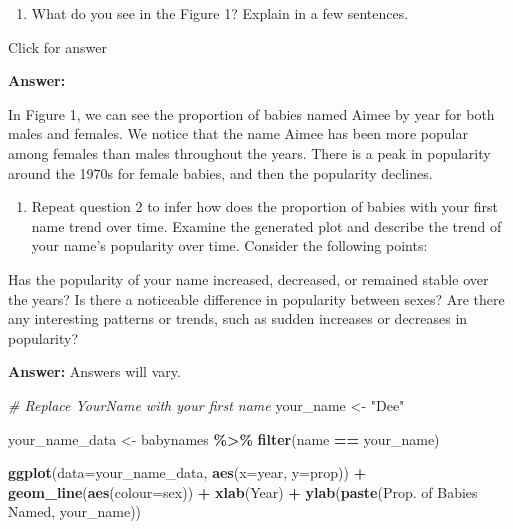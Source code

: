 \documentclass[
]{book}
\newenvironment{Shaded}{\begin{snugshade}}{\end{snugshade}}
\newcommand{\AttributeTok}[1]{\textcolor[rgb]{0.13,0.29,0.53}{#1}}
\newcommand{\CommentTok}[1]{\textcolor[rgb]{0.56,0.35,0.01}{\textit{#1}}}
\newcommand{\FunctionTok}[1]{\textcolor[rgb]{0.13,0.29,0.53}{\textbf{#1}}}
\newcommand{\NormalTok}[1]{#1}
\newcommand{\OtherTok}[1]{\textcolor[rgb]{0.56,0.35,0.01}{#1}}
\newcommand{\SpecialCharTok}[1]{\textcolor[rgb]{0.81,0.36,0.00}{\textbf{#1}}}
\newcommand{\StringTok}[1]{\textcolor[rgb]{0.31,0.60,0.02}{#1}}
\providecommand{\tightlist}{%
  \setlength{\itemsep}{0pt}\setlength{\parskip}{0pt}}
\begin{document}
\begin{enumerate}
\def\labelenumi{\arabic{enumi}.}
\setcounter{enumi}{1}
\tightlist
\item
  What do you see in the Figure 1? Explain in a few sentences.
\end{enumerate}

Click for answer

\textbf{Answer:}

In Figure 1, we can see the proportion of babies named Aimee by year for both males and females. We notice that the name Aimee has been more popular among females than males throughout the years. There is a peak in popularity around the 1970s for female babies, and then the popularity declines.

\begin{enumerate}
\def\labelenumi{\arabic{enumi}.}
\setcounter{enumi}{2}
\tightlist
\item
  Repeat question 2 to infer how does the proportion of babies with your first name trend over time. Examine the generated plot and describe the trend of your name's popularity over time. Consider the following points:
\end{enumerate}

Has the popularity of your name increased, decreased, or remained stable over the years? Is there a noticeable difference in popularity between sexes? Are there any interesting patterns or trends, such as sudden increases or decreases in popularity?

\textbf{Answer:} Answers will vary.

\vspace*{0.2in}

\begin{Shaded}
\begin{Highlighting}[]
\CommentTok{\# Replace \textquotesingle{}YourName\textquotesingle{} with your first name}
\NormalTok{your\_name }\OtherTok{\textless{}{-}} \StringTok{"Dee"}

\NormalTok{your\_name\_data }\OtherTok{\textless{}{-}}\NormalTok{ babynames }\SpecialCharTok{\%\textgreater{}\%} \FunctionTok{filter}\NormalTok{(name }\SpecialCharTok{==}\NormalTok{ your\_name)}

\FunctionTok{ggplot}\NormalTok{(}\AttributeTok{data=}\NormalTok{your\_name\_data, }\FunctionTok{aes}\NormalTok{(}\AttributeTok{x=}\NormalTok{year, }\AttributeTok{y=}\NormalTok{prop)) }\SpecialCharTok{+} 
  \FunctionTok{geom\_line}\NormalTok{(}\FunctionTok{aes}\NormalTok{(}\AttributeTok{colour=}\NormalTok{sex)) }\SpecialCharTok{+} 
  \FunctionTok{xlab}\NormalTok{(}\StringTok{\textquotesingle{}Year\textquotesingle{}}\NormalTok{) }\SpecialCharTok{+} 
  \FunctionTok{ylab}\NormalTok{(}\FunctionTok{paste}\NormalTok{(}\StringTok{\textquotesingle{}Prop. of Babies Named\textquotesingle{}}\NormalTok{, your\_name))}
\end{Highlighting}
\end{Shaded}
\end{document}
